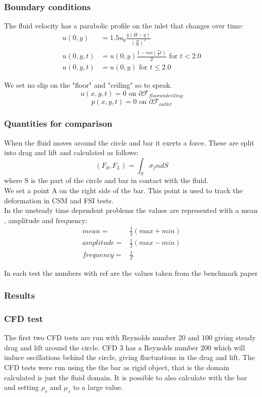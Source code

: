 \subsubsection*{Boundary conditions}
The fluid velocity has a parabolic profile on the inlet that changes over time:\\

\begin{align*}
u(0,y) &= 1.5u_0 \frac{y(H-y)}{(\frac{H}{2})^2}  \\
u(0,y,t) &= u(0,y)\frac{1-cos(\frac{\pi}{2}t)}{2} \text{  for  } t<2.0 \\
u(0,y,t) &= u(0,y) \text{  for  } t \leq 2.0
\end{align*}

We set no slip on the "floor" and "ceiling" so to speak.\\
$$ u(x,y,t) = 0 \text{  on  } \partial \mathcal{F}_{floor and ceiling} $$
$$  p(x,y,t) = 0 \text{  on  } \partial \mathcal{F}_{outlet} $$

\subsubsection*{Quantities for comparison}
When the fluid moves around the circle and bar it exerts a force. These are split into drag and lift and calculated as follows:
$$ (F_d, F_L) = \int_S \sigma_f n dS $$ 
where S is the part of the circle and bar in contact with the fluid. \\
We set a point A on the right side of the bar. This point is used to track the deformation in CSM and FSI tests. \\
In the unsteady time dependent problems the values are represented with a mean , amplitude and frequency:
\begin{align}
mean =& \frac{1}{2} (max + min) \\
amplitude =& \frac{1}{2} (max - min)\\
frequency =& \frac{1}{T}
\end{align}

In each test the numbers with ref are the values taken from the benchmark paper \cite{Hron2006a}

\subsubsection{Results}
\subsubsection{CFD test}
The first two CFD tests are run with Reynolds number 20 and 100 giving steady drag and lift around the circle. CFD 3 has a Reynolds number 200 which will induce oscillations behind the circle, giving fluctuations in the drag and lift.
The CFD tests were run using the the bar as rigid object, that is the domain calculated is just the fluid domain. It is possible to also calculate with the bar and setting $\rho_s$ and $\mu_s$ to a large value. 

